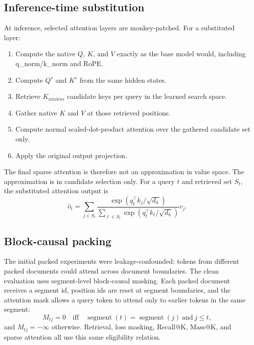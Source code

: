 \documentclass[10pt]{article}
\begin{document}
\subsection{Inference-time substitution}
At inference, selected attention layers are monkey-patched. For a substituted
layer:
\begin{enumerate}
    \item Compute the native $Q$, $K$, and $V$ exactly as the base model would,
    including q\_norm/k\_norm and RoPE.
    \item Compute $Q^s$ and $K^s$ from the same hidden states.
    \item Retrieve $K_{\mathrm{retrieve}}$ candidate keys per query in the
    learned search space.
    \item Gather native $K$ and $V$ at those retrieved positions.
    \item Compute normal scaled-dot-product attention over the gathered
    candidate set only.
    \item Apply the original output projection.
\end{enumerate}
The final sparse attention is therefore not an approximation in value space.
The approximation is in candidate selection only. For a query $t$ and retrieved
set $S_t$, the substituted attention output is
\begin{equation}
    \hat{o}_t=\sum_{j\in S_t}
    \frac{\exp(q_t^\top k_j/\sqrt{d_h})}{\sum_{\ell\in S_t}\exp(q_t^\top k_\ell/\sqrt{d_h})}v_j.
\end{equation}

\subsection{Block-causal packing}
The initial packed experiments were leakage-confounded: tokens from different
packed documents could attend across document boundaries. The clean evaluation
uses segment-level block-causal masking. Each packed document receives a
segment id, position ids are reset at segment boundaries, and the attention mask
allows a query token to attend only to earlier tokens in the same segment:
\begin{equation}
    M_{tj}=0\quad\mathrm{iff}\quad
    \operatorname{segment}(t)=\operatorname{segment}(j)\ \mathrm{and}\ j\leq t,
\end{equation}
and $M_{tj}=-\infty$ otherwise. Retrieval, loss masking, Recall@K, Mass@K, and
sparse attention all use this same eligibility relation.
\end{document}
